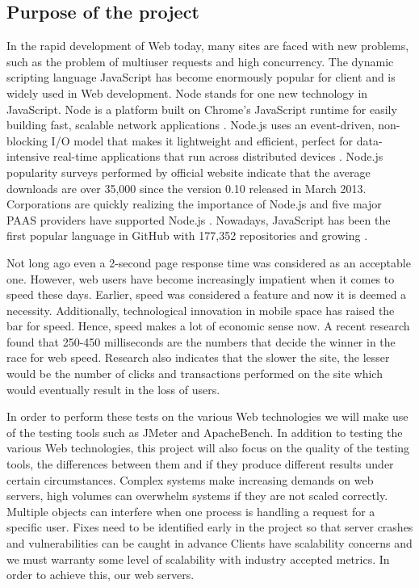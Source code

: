 \documentclass[../thesis.tex]{subfiles}
\begin{document}
\subsection{Purpose of the project}
In the rapid development of Web today, many sites are faced with new problems, such as the problem of multiuser requests and high concurrency. The dynamic scripting language JavaScript has become enormously popular for client and is widely used in Web development. Node stands for one new technology in JavaScript. Node is a platform built on Chrome's JavaScript runtime for easily building fast, scalable network applications \cite{server}. Node.js uses an event-driven, non- blocking I/O model that makes it lightweight and efficient, perfect for data-intensive real-time applications that run across distributed devices \cite{server}. Node.js popularity surveys performed by official website indicate that the average downloads are over 35,000 since the version 0.10 released in March 2013. Corporations are quickly realizing the importance of Node.js and five major PAAS providers have supported Node.js \cite{node}. Nowadays, JavaScript has been the first popular language in GitHub with 177,352 repositories and growing \cite{github-js}. 
\linebreak

Not long ago even a 2-second page response time was considered as an acceptable one. However, web users have become increasingly impatient when it comes to speed these days. Earlier, speed was considered a feature and now it is deemed a necessity. Additionally, technological innovation in mobile space has raised the bar for speed. Hence, speed makes a lot of economic sense now. A recent research found that 250-450 milliseconds are the numbers that decide the winner in the race for web speed. Research also indicates that the slower the site, the lesser would be the number of clicks and transactions performed on the site which would eventually result in the loss of users.
\linebreak

In order to perform these tests on the various Web technologies we will make use of the testing tools such as JMeter and ApacheBench. In addition to testing the various Web technologies, this project will also focus on the quality of the testing tools, the differences between them and if they produce different results under certain circumstances. Complex systems make increasing demands on web servers, high volumes can overwhelm systems if they are not scaled correctly. Multiple objects can interfere when one process is handling a request for a specific user. Fixes need to be identified early in the project so that server crashes and vulnerabilities can be caught in advance Clients have scalability concerns and we must warranty some level of scalability with industry accepted metrics. In order to achieve this, our web servers.
\linebreak
\end{document}
